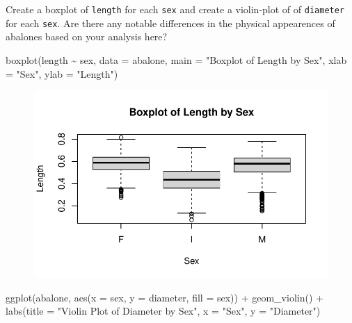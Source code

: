 \documentclass[
  letterpaper,
  DIV=11,
  numbers=noendperiod]{scrartcl}
\newenvironment{Shaded}{\begin{snugshade}}{\end{snugshade}}
\newcommand{\AttributeTok}[1]{\textcolor[rgb]{0.40,0.45,0.13}{#1}}
\newcommand{\FunctionTok}[1]{\textcolor[rgb]{0.28,0.35,0.67}{#1}}
\newcommand{\NormalTok}[1]{\textcolor[rgb]{0.00,0.23,0.31}{#1}}
\newcommand{\SpecialCharTok}[1]{\textcolor[rgb]{0.37,0.37,0.37}{#1}}
\newcommand{\StringTok}[1]{\textcolor[rgb]{0.13,0.47,0.30}{#1}}
\begin{document}
Create a boxplot of \texttt{length} for each \texttt{sex} and create a
violin-plot of of \texttt{diameter} for each \texttt{sex}. Are there any
notable differences in the physical appearences of abalones based on
your analysis here?

\begin{Shaded}
\begin{Highlighting}[]
\FunctionTok{boxplot}\NormalTok{(length }\SpecialCharTok{\textasciitilde{}}\NormalTok{ sex, }\AttributeTok{data =}\NormalTok{ abalone, }
        \AttributeTok{main =} \StringTok{"Boxplot of Length by Sex"}\NormalTok{,}
        \AttributeTok{xlab =} \StringTok{"Sex"}\NormalTok{, }\AttributeTok{ylab =} \StringTok{"Length"}\NormalTok{)}
\end{Highlighting}
\end{Shaded}

\begin{figure}[H]

{\centering \includegraphics{hw2_files/figure-pdf/unnamed-chunk-5-1.pdf}

}

\end{figure}

\begin{Shaded}
\begin{Highlighting}[]
\FunctionTok{ggplot}\NormalTok{(abalone, }\FunctionTok{aes}\NormalTok{(}\AttributeTok{x =}\NormalTok{ sex, }\AttributeTok{y =}\NormalTok{ diameter, }\AttributeTok{fill =}\NormalTok{ sex)) }\SpecialCharTok{+}
  \FunctionTok{geom\_violin}\NormalTok{() }\SpecialCharTok{+}
  \FunctionTok{labs}\NormalTok{(}\AttributeTok{title =} \StringTok{"Violin Plot of Diameter by Sex"}\NormalTok{, }\AttributeTok{x =} \StringTok{"Sex"}\NormalTok{, }\AttributeTok{y =} \StringTok{"Diameter"}\NormalTok{)}
\end{Highlighting}
\end{Shaded}
\end{document}
